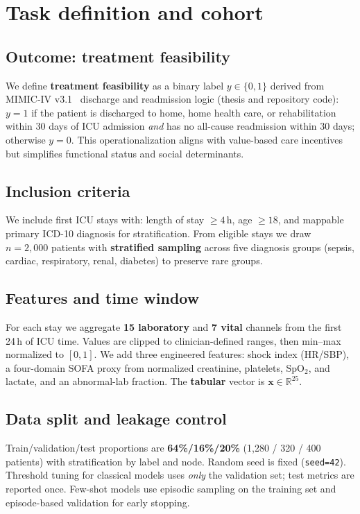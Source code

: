 \section{Task definition and cohort}
\label{sec:task}

\subsection{Outcome: treatment feasibility}
We define \textbf{treatment feasibility} as a binary label $y \in \{0,1\}$ derived from MIMIC-IV v3.1~\citep{johnson2023mimic} discharge and readmission logic (thesis and repository code): $y{=}1$ if the patient is discharged to home, home health care, or rehabilitation within 30 days of ICU admission \emph{and} has no all-cause readmission within 30 days; otherwise $y{=}0$. This operationalization aligns with value-based care incentives but simplifies functional status and social determinants.

\subsection{Inclusion criteria}
We include first ICU stays with: length of stay $\geq 4$\,h, age $\geq 18$, and mappable primary ICD-10 diagnosis for stratification. From eligible stays we draw $n{=}2{,}000$ patients with \textbf{stratified sampling} across five diagnosis groups (sepsis, cardiac, respiratory, renal, diabetes) to preserve rare groups.

\subsection{Features and time window}
For each stay we aggregate \textbf{15 laboratory} and \textbf{7 vital} channels from the first 24\,h of ICU time. Values are clipped to clinician-defined ranges, then min--max normalized to $[0,1]$. We add three engineered features: shock index (HR/SBP), a four-domain SOFA proxy from normalized creatinine, platelets, SpO$_2$, and lactate, and an abnormal-lab fraction. The \textbf{tabular} vector is $\mathbf{x} \in \mathbb{R}^{25}$.

\subsection{Data split and leakage control}
Train/validation/test proportions are \textbf{64\%/16\%/20\%} (1{,}280 / 320 / 400 patients) with stratification by label and node. Random seed is fixed (\texttt{seed=42}). Threshold tuning for classical models uses \emph{only} the validation set; test metrics are reported once. Few-shot models use episodic sampling on the training set and episode-based validation for early stopping.

